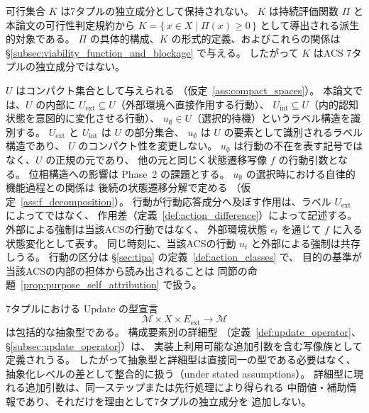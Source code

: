 \begin{remark}
\label{rem:K_position}
可行集合 $K$ は7タプルの独立成分として保持されない。
$K$ は持続評価関数 $\Pi$ と本論文の可行性判定規約から
$K = \{\,x\in X\mid \Pi(x)\geq0\,\}$
として導出される派生的対象である。
$\Pi$ の具体的構成、$K$ の形式的定義、およびこれらの関係は
\S\ref{subsec:viability_function_and_blockage} で与える。
したがって $K$ はACS 7タプルの独立成分ではない。
\end{remark}

\begin{remark}
\label{rem:action_space_structure}
$U$ はコンパクト集合として与えられる
（仮定~\ref{ass:compact_spaces}）。
本論文では、$U$ の内部に
$U_{\mathrm{ext}}\subseteq U$（外部環境へ直接作用する行動）、
$U_{\mathrm{int}}\subseteq U$（内的認知状態を意図的に変化させる行動）、
$u_{\emptyset}\in U$（選択的待機）というラベル構造を識別する。
$U_{\mathrm{ext}}$ と $U_{\mathrm{int}}$ は $U$ の部分集合、
$u_{\emptyset}$ は $U$ の要素として識別されるラベル構造であり、
$U$ のコンパクト性を変更しない。
$u_{\emptyset}$ は行動の不在を表す記号ではなく、$U$ の正規の元であり、
他の元と同じく状態遷移写像 $f$ の行動引数となる。
位相構造への影響は Phase~2 の課題とする。
$u_{\emptyset}$ の選択時における自律的機能過程との関係は
後続の状態遷移分解で定める
（仮定~\ref{ass:f_decomposition}）。
行動が行動応答成分へ及ぼす作用は、ラベル $U_{\mathrm{ext}}$ によってではなく、
作用差（定義~\ref{def:action_difference}）によって記述する。
外部による強制は当該ACSの行動ではなく、
外部環境状態 $e_t$ を通じて $f$ に入る状態変化として表す。
同じ時刻に、当該ACSの行動 $u_t$ と外部による強制は共存しうる。
行動の区分は \S\ref{sec:tipa} の定義~\ref{def:action_classes} で、
目的の基準が当該ACSの内部の担体から読み出されることは
同節の命題~\ref{prop:purpose_self_attribution} で扱う。
\end{remark}

\begin{remark}[Updateの型宣言の二層構造]
\label{rem:update_type_two_layers}
7タプルにおける $\mathrm{Update}$ の型宣言
\[
  \mathcal{M}\times X\times E_{\mathrm{ext}}
  \longrightarrow
  \mathcal{M}
\]
は包括的な抽象型である。
構成要素別の詳細型
（定義~\ref{def:update_operator}、
\S\ref{subsec:update_operator}）は、
実装上利用可能な追加引数を含む写像族として定義されうる。
したがって抽象型と詳細型は直接同一の型である必要はなく、
抽象化レベルの差として整合的に扱う（under stated assumptions）。
詳細型に現れる追加引数は、同一ステップまたは先行処理により得られる
中間値・補助情報であり、それだけを理由として7タプルの独立成分を
追加しない。
\end{remark}

